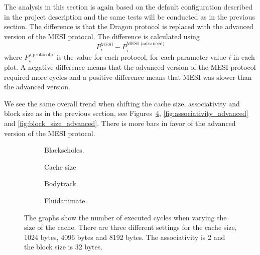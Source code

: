 The analysis in this section is again based on the default configuration described in
the project description and the same tests will be conducted as in the previous
section. The difference is that the Dragon protocol is replaced with the
advanced version of the MESI protocol. The difference is calculated using
$$
    P^\text{MESI}_i - P^\text{MESI (advanced)}_i
$$
where $ P^\text{<protocol>}_i $ is the value for each protocol, for each
parameter value $i$ in each plot. A negative difference means that the advanced
version of the MESI protocol required more cycles and a positive difference means
that MESI was slower than the advanced version.

We see the same overall trend when shifting the cache size, associativity and block size
as in the previous section, see Figures~\ref{fig:cache_size_advanced},
\ref{fig:associativity_advanced} and \ref{fig:block_size_advanced}. There is more
bars in favor of the advanced version of the MESI protocol.


\begin{figure}[H]
    \centering
    \begin{subfigure}[b]{0.33\textwidth}
        \centering
        \caption{Blackscholes.}\label{fig:cache_size_blackscholes_advanced}
    \end{subfigure}%
    \hfill
    \begin{subfigure}[b]{0.33\textwidth}
        \centering
        Cache size\par\medskip
        \caption{Bodytrack.}\label{fig:cache_size_bodytrack_advanced}
    \end{subfigure}%
    \hfill
    \begin{subfigure}[b]{0.33\textwidth}
        \centering
        \caption{Fluidanimate.}\label{fig:cache_size_fluidanimate_advanced}
    \end{subfigure}
    \hfill
    \caption{The graphs show the number of executed cycles when varying the size of the cache. There are three different settings for the cache size, 1024 bytes, 4096 bytes and 8192 bytes. The associativity is 2 and the block size is 32 bytes.}\label{fig:cache_size_advanced}
\end{figure}

